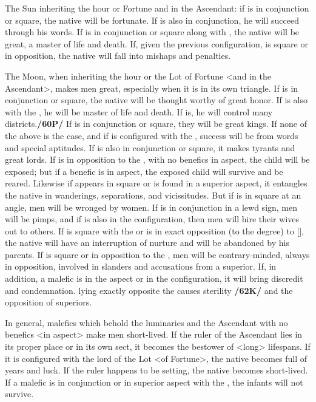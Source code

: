  The Sun inheriting the hour or Fortune and in the Ascendant: if \Jupiter\xspace is in conjunction or square, the native will be fortunate. If \Mercury\xspace is also in conjunction, he will succeed through his words. If \Mars\xspace is in conjunction or square along with \Jupiter, the native will be great, a master of life and death. If, given the previous configuration, \Saturn\xspace is square or in opposition, the native will fall into mishaps and penalties.

 The Moon, when inheriting the hour or the Lot of Fortune <and in the Ascendant>, makes men great, especially when it is in its own triangle. If \Venus\xspace is in conjunction or square, the native will be thought worthy of great honor. If \Mars\xspace is also with the \Moon, he will be master of life and death. If \Saturn\xspace is, he will control many districts.\textbf{/60P/} If \Jupiter\xspace is in conjunction or square, they will be great kings. If none of the above is the case, and if \Mercury\xspace is configured with the \Moon, success will be from words and special aptitudes. If \Mars\xspace is also in conjunction or square, it makes tyrants and great lords. If \Mars\xspace is in opposition to the \Moon, with no benefics in aspect, the child will be exposed; but if a benefic is in aspect, the exposed child will survive and be reared. Likewise if \Mars\xspace appears in square or is found in a superior aspect, it entangles the native in wanderings, separations, and vicissitudes. But if \Venus\xspace is in square at an angle, men will be wronged by women. If \Saturn\xspace is in conjunction in a lewd sign, men will be pimps, and if \Mars\xspace is also in the configuration, then men will hire their wives out to others. If \Saturn\xspace is square with the \Moon\xspace or is in \mned exact opposition (to the degree) to [\Saturn], the native will have an interruption of nurture and will be abandoned by his parents. If \Mercury\xspace is square or in opposition to the \Moon, men will be contrary-minded, always in opposition, involved in slanders and accusations from a superior. If, in addition, a malefic is in the aspect or in the configuration, it will bring discredit and condemnation. \Jupiter\xspace lying \mned exactly opposite the \Moon\xspace causes sterility \textbf{/62K/} and the opposition of superiors.

\mndl[0.2cm]
In general, malefics which behold the luminaries and the Ascendant with no benefics <in aspect> make men short-lived. If the ruler of the Ascendant lies in its proper place or in its own sect, it becomes the bestower of <long> lifespans. If it is configured with the lord of the Lot <of Fortune>, the native becomes full of years and luck. If the ruler happens to be setting, the native becomes short-lived. If a malefic is in conjunction or in superior aspect with the \Moon, the infants will not survive.

\newpage